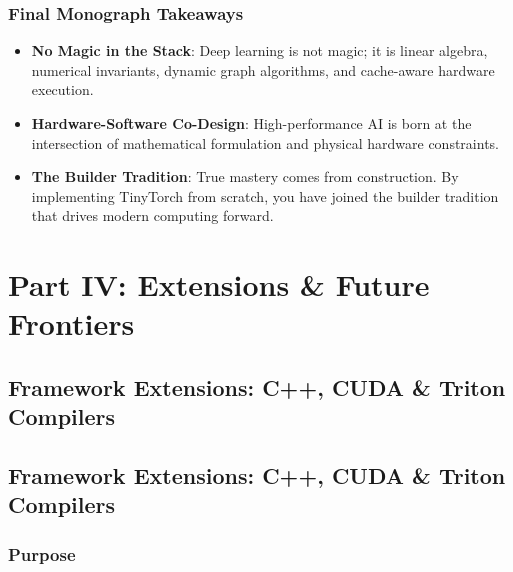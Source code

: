 \documentclass[
  letterpaper,
]{scrbook}
\providecommand{\tightlist}{%
  \setlength{\itemsep}{0pt}\setlength{\parskip}{0pt}}
\begin{document}
\section*{Final Monograph Takeaways}\label{final-monograph-takeaways}


\begin{itemize}
\tightlist
\item
  \textbf{No Magic in the Stack}: Deep learning is not magic; it is
  linear algebra, numerical invariants, dynamic graph algorithms, and
  cache-aware hardware execution.
\item
  \textbf{Hardware-Software Co-Design}: High-performance AI is born at
  the intersection of mathematical formulation and physical hardware
  constraints.
\item
  \textbf{The Builder Tradition}: True mastery comes from construction.
  By implementing TinyTorch from scratch, you have joined the builder
  tradition that drives modern computing forward.
\end{itemize}

\part{Part IV: Extensions \& Future Frontiers}

\chapter{Framework Extensions: C++, CUDA \& Triton
Compilers}\label{framework-extensions-c-cuda-triton-compilers}

\chapter*{Framework Extensions: C++, CUDA \& Triton
Compilers}\label{framework-extensions-c-cuda-triton-compilers-1}


\section*{Purpose}\label{purpose-24}
\end{document}
